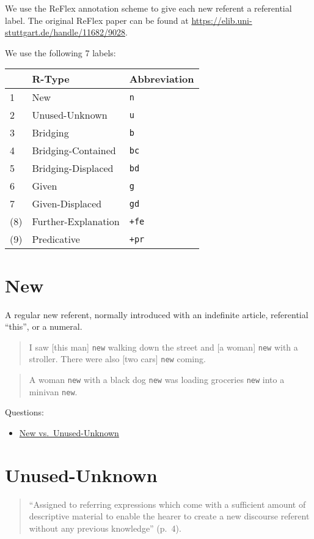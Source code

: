 \documentclass[
]{book}
\providecommand{\tightlist}{%
  \setlength{\itemsep}{0pt}\setlength{\parskip}{0pt}}
\begin{document}
We use the ReFlex annotation scheme to give each new referent a referential label.
The original ReFlex paper can be found at \url{https://elib.uni-stuttgart.de/handle/11682/9028}.

We use the following 7 labels:

\begin{longtable}[]{@{}lll@{}}
\toprule
& R-Type & Abbreviation\tabularnewline
\midrule
\endhead
1 & New & \texttt{n}\tabularnewline
2 & Unused-Unknown & \texttt{u}\tabularnewline
3 & Bridging & \texttt{b}\tabularnewline
4 & Bridging-Contained & \texttt{bc}\tabularnewline
5 & Bridging-Displaced & \texttt{bd}\tabularnewline
6 & Given & \texttt{g}\tabularnewline
7 & Given-Displaced & \texttt{gd}\tabularnewline
(8) & Further-Explanation & \texttt{+fe}\tabularnewline
(9) & Predicative & \texttt{+pr}\tabularnewline
\bottomrule
\end{longtable}

\hypertarget{new}{%
\section{New}\label{new}}

A regular new referent, normally introduced with an indefinite article, referential ``this'', or a numeral.

\begin{quote}
I saw {[}this man{]} \texttt{new} walking down the street and {[}a woman{]} \texttt{new} with a stroller.
There were also {[}two cars{]} \texttt{new} coming.
\end{quote}

\begin{quote}
A woman \texttt{new} with a black dog \texttt{new} was loading groceries \texttt{new} into a minivan \texttt{new}.
\end{quote}

Questions:

\begin{itemize}
\tightlist
\item
  \protect\hyperlink{new-vs.-unused-unknown}{New vs.~Unused-Unknown}
\end{itemize}

\hypertarget{unused-unknown}{%
\section{Unused-Unknown}\label{unused-unknown}}

\begin{quote}
``Assigned to referring expressions which come with a sufficient amount of descriptive material to enable the hearer to create a new discourse referent without any previous knowledge'' (p.~4).
\end{quote}
\end{document}
